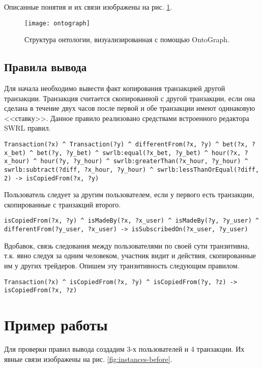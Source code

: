 			Описанные понятия и их связи изображены на рис. \ref{fig:ontograph}.
			
			\begin{figure}[h]
				\centering
				\texttt{[image: ontograph]}
				\caption{Структура онтологии, визуализированная с помощью OntoGraph.}
				\label{fig:ontograph}
			\end{figure}
		
		\newpage
		\subsection{Правила вывода}
			Для начала необходимо вывести факт копирования транзакцией другой транзакции. Транзакция считается скопированной с другой транзакции, если она сделана в течение двух часов после первой и обе транзакции имеют одинаковую <<ставку>>. Данное правило реализовано средствами встроенного редактора SWRL правил.
			
			\begin{lstlisting}
Transaction(?x) ^ Transaction(?y) ^ differentFrom(?x, ?y) ^ bet(?x, ?x_bet) ^ bet(?y, ?y_bet) ^ swrlb:equal(?x_bet, ?y_bet) ^ hour(?x, ?x_hour) ^ hour(?y, ?y_hour) ^ swrlb:greaterThan(?x_hour, ?y_hour) ^ swrlb:subtract(?diff, ?x_hour, ?y_hour) ^ swrlb:lessThanOrEqual(?diff, 2) -> isCopiedFrom(?x, ?y)
			\end{lstlisting}
			
			Пользователь следует за другим пользователем, если у первого есть транзакции, скопированные с транзакций второго.
			
			\begin{lstlisting}
isCopiedFrom(?x, ?y) ^ isMadeBy(?x, ?x_user) ^ isMadeBy(?y, ?y_user) ^ differentFrom(?y_user, ?x_user) -> isSubscribedOn(?x_user, ?y_user)
			\end{lstlisting}
			
			Вдобавок, связь следования между пользователями по своей сути транзитивна, т.к. явно следуя за одним человеком, участник видит и действия, скопированные им у других трейдеров. Опишем эту транзитивность следующим правилом.
			\begin{lstlisting}
Transaction(?x) ^ isCopiedFrom(?x, ?y) ^ isCopiedFrom(?y, ?z) -> isCopiedFrom(?x, ?z)
			\end{lstlisting}
			
	\section{Пример работы}
		Для проверки правил вывода создадим 3-х пользователей и 4 транзакции. Их явные связи изображены на рис. \ref{fig:instances-before}.
		
